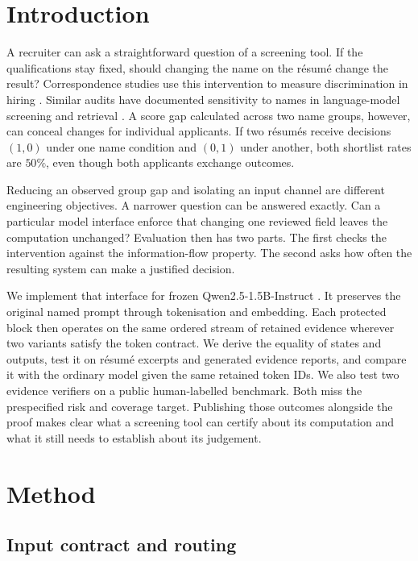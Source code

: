 \documentclass[11pt,a4paper]{article}
\begin{document}


\section{Introduction}

A recruiter can ask a straightforward question of a screening tool. If the qualifications stay fixed, should changing the name on the résumé change the result? Correspondence studies use this intervention to measure discrimination in hiring \citep{bertrand2004}. Similar audits have documented sensitivity to names in language-model screening and retrieval \citep{armstrong2024,wilson2024}. A score gap calculated across two name groups, however, can conceal changes for individual applicants. If two résumés receive decisions \( (1,0) \) under one name condition and \( (0,1) \) under another, both shortlist rates are \(50\%\), even though both applicants exchange outcomes.

Reducing an observed group gap and isolating an input channel are different engineering objectives. A narrower question can be answered exactly. Can a particular model interface enforce that changing one reviewed field leaves the computation unchanged? Evaluation then has two parts. The first checks the intervention against the information-flow property. The second asks how often the resulting system can make a justified decision.

We implement that interface for frozen Qwen2.5-1.5B-Instruct \citep{qwen2024}. It preserves the original named prompt through tokenisation and embedding. Each protected block then operates on the same ordered stream of retained evidence wherever two variants satisfy the token contract. We derive the equality of states and outputs, test it on résumé excerpts and generated evidence reports, and compare it with the ordinary model given the same retained token IDs. We also test two evidence verifiers on a public human-labelled benchmark. Both miss the prespecified risk and coverage target. Publishing those outcomes alongside the proof makes clear what a screening tool can certify about its computation and what it still needs to establish about its judgement.



\section{Method}
\subsection{Input contract and routing}
\end{document}
